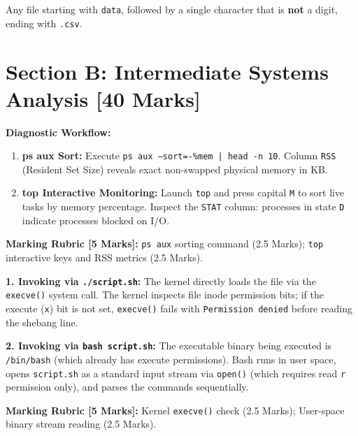 \begin{examsol}
Any file starting with \texttt{data}, followed by a single character that is \textbf{not} a digit, ending with \texttt{.csv}.
\end{examsol}

\section*{Section B: Intermediate Systems Analysis [40 Marks]}


\begin{examsol}
\textbf{Diagnostic Workflow:}
\begin{enumerate}[leftmargin=1.5em]
    \item \textbf{ps aux Sort:} Execute \texttt{ps aux --sort=-\%mem | head -n 10}. Column \texttt{RSS} (Resident Set Size) reveals exact non-swapped physical memory in KB.
    \item \textbf{top Interactive Monitoring:} Launch \texttt{top} and press capital \texttt{M} to sort live tasks by memory percentage. Inspect the \texttt{STAT} column: processes in state \texttt{D} indicate processes blocked on I/O.
\end{enumerate}

\begin{markingrubric}
\textbf{Marking Rubric [5 Marks]:} \texttt{ps aux} sorting command (2.5 Marks); \texttt{top} interactive keys and RSS metrics (2.5 Marks).
\end{markingrubric}
\end{examsol}


\begin{examsol}
\textbf{1. Invoking via \texttt{./script.sh}:}
The kernel directly loads the file via the \texttt{execve()} system call. The kernel inspects file inode permission bits; if the execute (\texttt{x}) bit is not set, \texttt{execve()} fails with \texttt{Permission denied} before reading the shebang line.

\textbf{2. Invoking via \texttt{bash script.sh}:}
The executable binary being executed is \texttt{/bin/bash} (which already has execute permissions). Bash runs in user space, opens \texttt{script.sh} as a standard input stream via \texttt{open()} (which requires read \texttt{r} permission only), and parses the commands sequentially.

\begin{markingrubric}
\textbf{Marking Rubric [5 Marks]:} Kernel \texttt{execve()} check (2.5 Marks); User-space binary stream reading (2.5 Marks).
\end{markingrubric}
\end{examsol}

